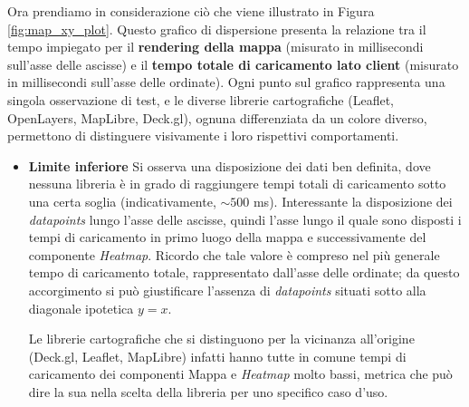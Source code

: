 Ora prendiamo in considerazione ciò che viene illustrato in Figura \ref{fig:map_xy_plot}. Questo  grafico di dispersione presenta la relazione tra il tempo impiegato per il \textbf{rendering della mappa} (misurato in millisecondi sull'asse delle ascisse) e il \textbf{tempo totale di caricamento lato client} (misurato in millisecondi sull'asse delle ordinate). Ogni punto sul grafico rappresenta una singola osservazione di test, e le diverse librerie cartografiche (Leaflet, OpenLayers, MapLibre, Deck.gl), ognuna differenziata da un colore diverso, permettono di distinguere visivamente i loro rispettivi comportamenti.

\begin{itemize}
    \item \textbf{Limite inferiore}
    Si osserva una disposizione dei dati ben definita, dove nessuna libreria è in grado di raggiungere tempi totali di caricamento sotto una certa soglia (indicativamente, $\sim 500$ ms). Interessante la disposizione dei \textit{datapoints} lungo l'asse delle ascisse, quindi l'asse lungo il quale sono disposti i tempi di caricamento in primo luogo della mappa e successivamente del componente \textit{Heatmap}. Ricordo che tale valore è compreso nel più generale tempo di caricamento totale, rappresentato dall'asse delle ordinate; da questo accorgimento si può giustificare l'assenza di \textit{datapoints} situati sotto alla diagonale ipotetica $y=x$.
    
    Le librerie cartografiche che si distinguono per la vicinanza all'origine (Deck.gl, Leaflet, MapLibre) infatti hanno tutte in comune tempi di caricamento dei componenti Mappa e \textit{Heatmap} molto bassi, metrica che può dire la sua nella scelta della libreria per uno specifico caso d'uso.


\end{itemize}
